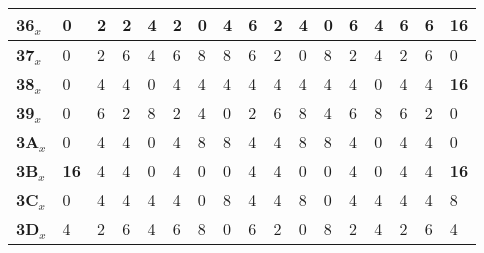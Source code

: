 \begin{longtable}[c]{|l|l|l|l|l|l|l|l|l|l|l|l|l|l|l|l|l|}
\textbf{36$_x$} & 0              & 2              & 2              & 4              & 2              & 0              & 4              & 6              & 2              & 4              & 0              & 6              & 4              & 6              & 6              & \textbf{16}             \\ \hline
\textbf{37$_x$} & 0              & 2              & 6              & 4              & 6              & 8              & 8              & 6              & 2              & 0              & 8              & 2              & 4              & 2              & 6              & 0              \\ \hline
\textbf{38$_x$} & 0              & 4              & 4              & 0              & 4              & 4              & 4              & 4              & 4              & 4              & 4              & 4              & 0              & 4              & 4              & \textbf{16}             \\ \hline
\textbf{39$_x$} & 0              & 6              & 2              & 8              & 2              & 4              & 0              & 2              & 6              & 8              & 4              & 6              & 8              & 6              & 2              & 0              \\ \hline
\textbf{3A$_x$} & 0              & 4              & 4              & 0              & 4              & 8              & 8              & 4              & 4              & 8              & 8              & 4              & 0              & 4              & 4              & 0              \\ \hline
\textbf{3B$_x$} & \textbf{16}             & 4              & 4              & 0              & 4              & 0              & 0              & 4              & 4              & 0              & 0              & 4              & 0              & 4              & 4              & \textbf{16}             \\ \hline
\textbf{3C$_x$} & 0              & 4              & 4              & 4              & 4              & 0              & 8              & 4              & 4              & 8              & 0              & 4              & 4              & 4              & 4              & 8              \\ \hline
\textbf{3D$_x$} & 4              & 2              & 6              & 4              & 6              & 8              & 0              & 6              & 2              & 0              & 8              & 2              & 4              & 2              & 6              & 4              \\ \hline

\end{longtable}
